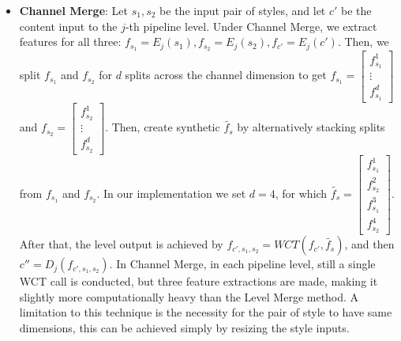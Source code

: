 \begin{itemize}
	\item \textbf{Channel Merge}: Let $s_1, s_2$ be the input pair of styles, and let $c'$ be the content input to the $j$-th pipeline level. Under Channel Merge, we extract features for all three: $f_{s_1} = E_j(s_1), f_{s_2} = E_j(s_2), f_{c'} = E_j(c')$. Then, we split $f_{s_1}$ and $f_{s_2}$ for $d$ splits across the channel dimension to get $f_{s_1} = \begin{bmatrix} f_{s_1}^1 \\ \vdots \\ f_{s_1}^d\end{bmatrix}$ and $f_{s_2} = \begin{bmatrix} f_{s_2}^1 \\ \vdots \\ f_{s_2}^d\end{bmatrix}$. Then, create synthetic $\tilde{f_{s}}$ by alternatively stacking splits from $f_{s_1}$ and $f_{s_2}$. In our implementation we set  $d=4$, for which $\tilde{f_{s}} = \begin{bmatrix} f_{s_1}^1 \\  f_{s_2}^2 \\  f_{s_1}^3 \\ f_{s_2}^4\end{bmatrix}$. After that, the level output is achieved by $f_{c',s_1,s_2} = WCT(f_{c'}, \tilde{f_{s}})$, and then $c'' = D_j(f_{c',s_1,s_2})$. In Channel Merge, in each pipeline level, still a single WCT call is conducted, but three feature extractions are made, making it slightly more computationally heavy than the Level Merge method. A limitation to this technique is the necessity for the pair of style to have same dimensions, this can be achieved simply by resizing the style inputs.
	

\end{itemize}
